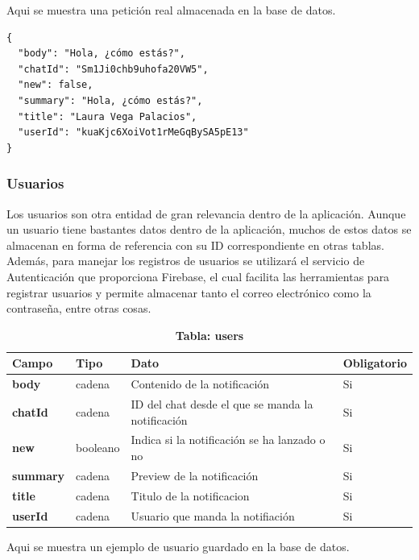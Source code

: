 \documentclass[a4paper, 12pt]{article}
\begin{document}
Aqui se muestra una petición real almacenada en la base de datos.

\begin{verbatim}
{
  "body": "Hola, ¿cómo estás?",
  "chatId": "Sm1Ji0chb9uhofa20VW5",
  "new": false,
  "summary": "Hola, ¿cómo estás?",
  "title": "Laura Vega Palacios",
  "userId": "kuaKjc6XoiVot1rMeGqBySA5pE13"
}
\end{verbatim}

\subsubsection{Usuarios}

Los usuarios son otra entidad de gran relevancia dentro de la aplicación. Aunque un usuario tiene bastantes datos dentro de la aplicación, muchos de estos datos se almacenan en forma de referencia con su ID correspondiente en otras tablas. Además, para manejar los registros de usuarios se utilizará el servicio de Autenticación que proporciona Firebase, el cual facilita las herramientas para registrar usuarios y permite almacenar tanto el correo electrónico como la contraseña, entre otras cosas.

\begin{table}[H]
\captionsetup{justification=raggedright,singlelinecheck=false}
\caption{\textbf{Tabla: users}}
\label{tab:users}
	\begin{tabular}{|m{3.2cm}|m{2cm}|m{5cm}|m{3cm}|}
	\hline
	\textbf{Campo} & \textbf{Tipo} & \textbf{Dato} & \textbf{Obligatorio} \\ 
	\hline
	\textbf{body} & cadena & Contenido de la notificación & Si \\ 
	\hline
	\textbf{chatId} & cadena &  ID del chat desde el que se manda la notificación & Si \\ 
	\hline
	\textbf{new} & booleano & Indica si la notificación se ha lanzado o no & Si \\ 
	\hline
	\textbf{summary} & cadena & Preview de la notificación & Si \\ 
	\hline
	\textbf{title} & cadena & Titulo de la notificacion & Si \\ 
	\hline
	\textbf{userId} & cadena & Usuario que manda la notifiación & Si \\ 
	\hline
	\end{tabular}
\end{table}

Aqui se muestra un ejemplo de usuario guardado en la base de datos.
\end{document}
